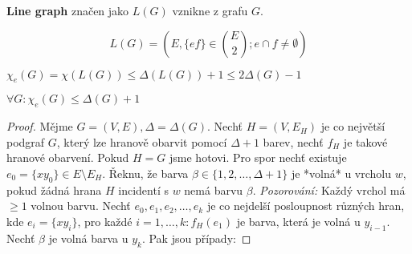 \begin{definice}
	\textbf{Line graph} značen jako $L(G)$ vznikne z grafu $G$.
	
	$$
	L(G) = (E, \{ef\} \in \binom{E}{2}; e \cap f \neq \emptyset)
	$$
\end{definice}

\begin{pozor}
	$\chi_{e}(G) = \chi(L(G)) \leq \Delta(L(G)) + 1 \leq 2 \Delta (G) - 1$
\end{pozor}

\begin{veta}[Vizing]
	$\forall G: \chi_{e}(G) \leq \Delta(G) + 1$
\end{veta}

\begin{proof}
	Mějme $G = (V,E), \Delta = \Delta(G)$. Nechť $H = (V,E_{H})$ je co největší podgraf $G$, který lze hranově obarvit pomocí $\Delta + 1$ barev, nechť $f_{H}$ je takové hranové obarvení. Pokud $H=G$ jsme hotovi. Pro spor nechť existuje $e_{0} = \{xy_{0}\} \in E \setminus E_{H}$. Řeknu, že barva $\beta \in \{1,2,\dots, \Delta + 1\}$ je *volná* u vrcholu $w$, pokud žádná hrana $H$ incidentí s $w$ nemá barvu $\beta$. \textit{Pozorování:} Každý vrchol má $\geq 1$ volnou barvu. Nechť $e_{0}, e_{1}, e_{2}, \dots, e_{k}$ je co nejdelší posloupnost různých hran, kde $e_{i} = \{xy_{i}\}$, pro každé $i = 1, \dots, k: f_{H}(e_{1})$ je barva, která je volná u $y_{i-1}$. Nechť $\beta$ je volná barva u $y_{k}$. Pak jsou případy:
	

\end{proof}
